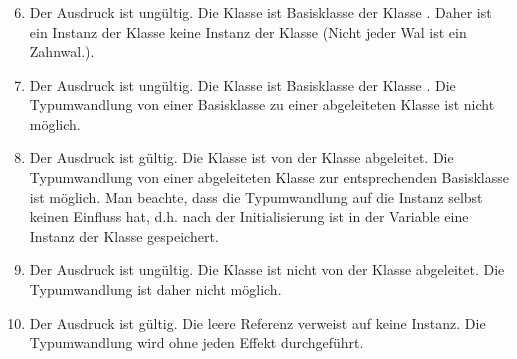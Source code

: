 \begin{frame}[t]%
  \frametitle{\theexercise}%

\begin{enumerate}
\setcounter{enumi}{5}
\item
  Der Ausdruck ist ung\"ultig.
  Die Klasse  ist Basisklasse der Klasse .
  Daher ist ein Instanz der Klasse  keine Instanz der Klasse  (\glqq Nicht jeder Wal ist ein Zahnwal.\grqq).
\item
  Der Ausdruck ist ung\"ultig.
  Die Klasse  ist Basisklasse der Klasse .
  Die Typumwandlung von einer Basisklasse zu einer abgeleiteten Klasse ist nicht m\"oglich.
\item
  Der Ausdruck ist g\"ultig.
  Die Klasse  ist von der Klasse  abgeleitet.
  Die Typumwandlung von einer abgeleiteten Klasse zur entsprechenden Basisklasse ist m\"oglich.
  Man beachte, dass die Typumwandlung auf die Instanz selbst keinen Einfluss hat, d.h{.} nach der Initialisierung ist in der Variable  eine Instanz der Klasse  gespeichert.
\item
  Der Ausdruck ist ung\"ultig.
  Die Klasse  ist nicht von der Klasse  abgeleitet.
  Die Typumwandlung ist daher nicht m\"oglich.
\item
  Der Ausdruck ist g\"ultig. Die leere Referenz  verweist auf keine Instanz.
  Die Typumwandlung wird ohne jeden Effekt durchgef\"uhrt.
\end{enumerate}
\end{frame}
